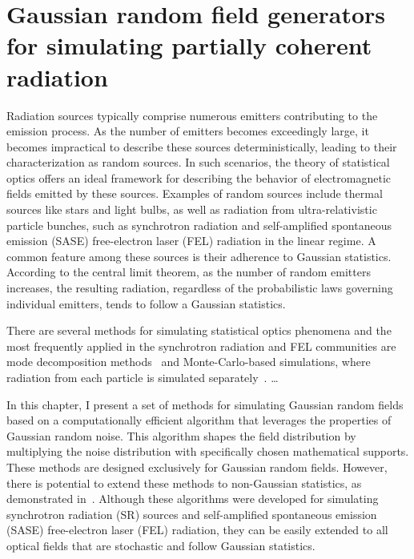 \chapter{Gaussian random field generators for simulating partially coherent radiation}
\label{Chapter:Gaussian random field generators for simulating partially coherent radiation}


    Radiation sources typically comprise numerous emitters contributing to the emission process. As the number of emitters becomes exceedingly large, it becomes impractical to describe these sources deterministically, leading to their characterization as random sources. In such scenarios, the theory of statistical optics offers an ideal framework for describing the behavior of electromagnetic fields emitted by these sources. Examples of random sources include thermal sources like stars and light bulbs, as well as radiation from ultra-relativistic particle bunches, such as synchrotron radiation and self-amplified spontaneous emission (SASE) free-electron laser (FEL) radiation in the linear regime. A common feature among these sources is their adherence to Gaussian statistics. According to the central limit theorem, as the number of random emitters increases, the resulting radiation, regardless of the probabilistic laws governing individual emitters, tends to follow a Gaussian statistics.

    There are several methods for simulating statistical optics phenomena and the most frequently applied in the synchrotron radiation and FEL communities are mode decomposition methods~ and Monte-Carlo-based simulations, where radiation from each particle is simulated separately~\cite{chubar_accurate_1998, reiche_genesis_1999}. … 

    In this chapter, I present a set of methods for simulating Gaussian random fields based on a computationally efficient algorithm that leverages the properties of Gaussian random noise. This algorithm shapes the field distribution by multiplying the noise distribution with specifically chosen mathematical supports. These methods are designed exclusively for Gaussian random fields. However, there is potential to extend these methods to non-Gaussian statistics, as demonstrated in~\cite{hong_algorithm_2021}. Although these algorithms were developed for simulating synchrotron radiation (SR) sources and self-amplified spontaneous emission (SASE) free-electron laser (FEL) radiation, they can be easily extended to all optical fields that are stochastic and follow Gaussian statistics.
   
